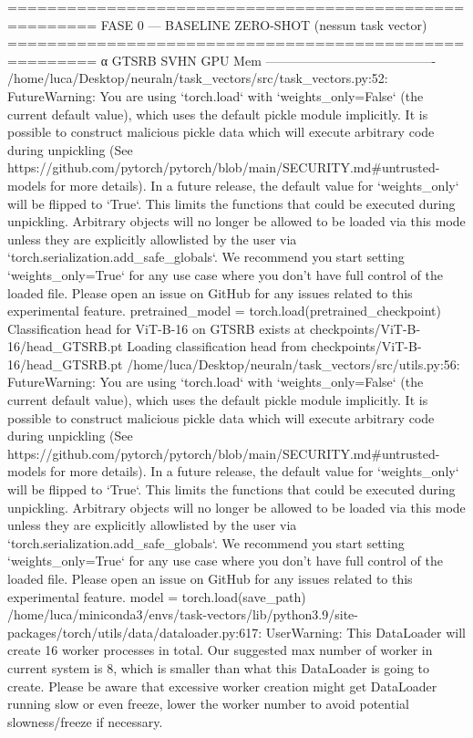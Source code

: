 =======================================================
  FASE 0 — BASELINE ZERO-SHOT (nessun task vector)
=======================================================
  α             GTSRB     SVHN    GPU Mem
  ----------------------------------------
/home/luca/Desktop/neuraln/task_vectors/src/task_vectors.py:52: FutureWarning: You are using `torch.load` with `weights_only=False` (the current default value), which uses the default pickle module implicitly. It is possible to construct malicious pickle data which will execute arbitrary code during unpickling (See https://github.com/pytorch/pytorch/blob/main/SECURITY.md#untrusted-models for more details). In a future release, the default value for `weights_only` will be flipped to `True`. This limits the functions that could be executed during unpickling. Arbitrary objects will no longer be allowed to be loaded via this mode unless they are explicitly allowlisted by the user via `torch.serialization.add_safe_globals`. We recommend you start setting `weights_only=True` for any use case where you don't have full control of the loaded file. Please open an issue on GitHub for any issues related to this experimental feature.
  pretrained_model = torch.load(pretrained_checkpoint)
Classification head for ViT-B-16 on GTSRB exists at checkpoints/ViT-B-16/head_GTSRB.pt
Loading classification head from checkpoints/ViT-B-16/head_GTSRB.pt
/home/luca/Desktop/neuraln/task_vectors/src/utils.py:56: FutureWarning: You are using `torch.load` with `weights_only=False` (the current default value), which uses the default pickle module implicitly. It is possible to construct malicious pickle data which will execute arbitrary code during unpickling (See https://github.com/pytorch/pytorch/blob/main/SECURITY.md#untrusted-models for more details). In a future release, the default value for `weights_only` will be flipped to `True`. This limits the functions that could be executed during unpickling. Arbitrary objects will no longer be allowed to be loaded via this mode unless they are explicitly allowlisted by the user via `torch.serialization.add_safe_globals`. We recommend you start setting `weights_only=True` for any use case where you don't have full control of the loaded file. Please open an issue on GitHub for any issues related to this experimental feature.
  model = torch.load(save_path)
/home/luca/miniconda3/envs/task-vectors/lib/python3.9/site-packages/torch/utils/data/dataloader.py:617: UserWarning: This DataLoader will create 16 worker processes in total. Our suggested max number of worker in current system is 8, which is smaller than what this DataLoader is going to create. Please be aware that excessive worker creation might get DataLoader running slow or even freeze, lower the worker number to avoid potential slowness/freeze if necessary.
